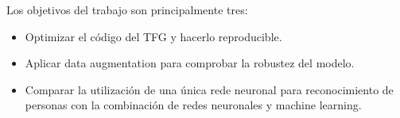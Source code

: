 
Los objetivos del trabajo son principalmente tres:
\begin{itemize}
    \item Optimizar el código del TFG y hacerlo reproducible.
    \item Aplicar data augmentation para comprobar la robustez del modelo.
    \item Comparar la utilización de una única rede neuronal para reconocimiento de personas con la combinación de redes neuronales y machine learning.                                                                                                                                                                                                           
\end{itemize}